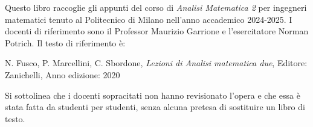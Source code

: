 Questo libro raccoglie gli appunti del corso di \emph{Analisi Matematica 2} per ingegneri matematici tenuto al Politecnico di Milano nell'anno accademico 2024-2025. I docenti di riferimento sono il Professor Maurizio Garrione e l'esercitatore Norman Potrich.
Il testo di riferimento è:

N. Fusco, P. Marcellini, C. Sbordone, \textit{Lezioni di Analisi matematica due}, Editore: Zanichelli, Anno edizione: 2020


Si sottolinea che i docenti sopracitati non hanno revisionato l'opera e che essa è stata fatta da studenti per studenti, senza alcuna pretesa di sostituire un libro di testo.